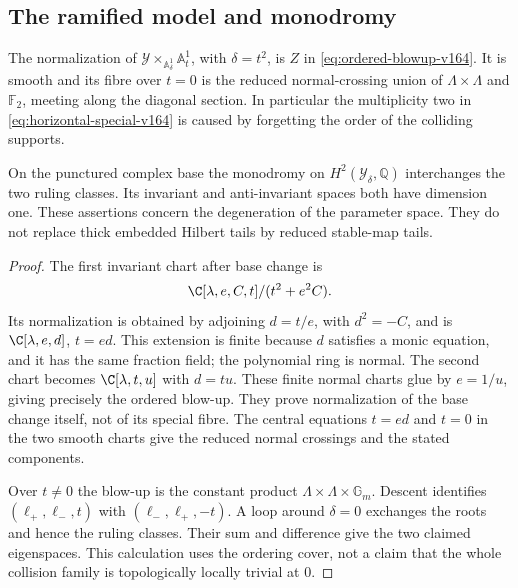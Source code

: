 \subsection{The ramified model and monodromy}
\begin{theorem}
\label{thm:ordered-resolution-v164}
The normalization of
$\mathcal Y\times_{\mathbb A^1_\delta}\mathbb A^1_t$, with
$\delta=t^2$, is $Z$ in \eqref{eq:ordered-blowup-v164}.
It is smooth and its fibre over $t=0$ is the reduced normal-crossing
union of $\Lambda\times\Lambda$ and $\mathbb F_2$, meeting along
the diagonal section. In particular the multiplicity two in
\eqref{eq:horizontal-special-v164} is caused by forgetting the order
of the colliding supports.

On the punctured complex base the monodromy on
$H^2(\mathcal Y_\delta,\mathbb Q)$ interchanges the two ruling
classes. Its invariant and anti-invariant spaces both have dimension
one. These assertions concern the degeneration of the parameter
space. They do not replace thick embedded Hilbert tails by reduced
stable-map tails.
\end{theorem}
\begin{proof}
The first invariant chart after base change is
\[
 \C[\lambda,e,C,t]/(t^2+e^2C).
\]
Its normalization is obtained by adjoining $d=t/e$, with
$d^2=-C$, and is $\C[\lambda,e,d]$, $t=ed$. This extension is
finite because $d$ satisfies a monic equation, and it has the same
fraction field; the polynomial ring is normal. The second chart
becomes $\C[\lambda,t,u]$ with $d=tu$. These finite normal charts
glue by $e=1/u$, giving precisely the ordered blow-up. They prove
normalization of the base change itself, not of its special fibre.
The central equations $t=ed$ and $t=0$ in the two smooth charts
give the reduced normal crossings and the stated components.

Over $t\ne0$ the blow-up is the constant product
$\Lambda\times\Lambda\times\mathbb G_m$. Descent identifies
$(\ell_+,\ell_-,t)$ with $(\ell_-,\ell_+,-t)$.
A loop around $\delta=0$ exchanges the roots and hence the ruling
classes. Their sum and difference give the two claimed eigenspaces.
This calculation uses the ordering cover, not a claim that the
whole collision family is topologically locally trivial at $0$.
\end{proof}

